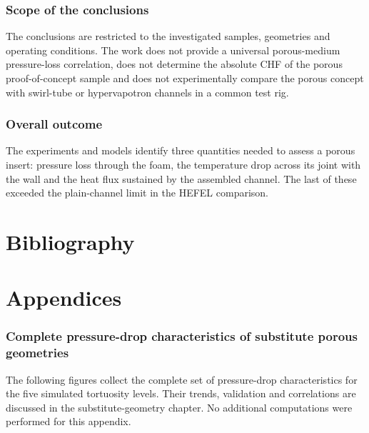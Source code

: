 \documentclass[a4paper]{article}
\begin{document}
\section{Scope of the conclusions}
The conclusions are restricted to the investigated samples, geometries and operating conditions. The work does not provide a universal porous-medium pressure-loss correlation, does not determine the absolute CHF of the porous proof-of-concept sample and does not experimentally compare the porous concept with swirl-tube or hypervapotron channels in a common test rig.

\section{Overall outcome}
The experiments and models identify three quantities needed to assess a porous insert: pressure loss through the foam, the temperature drop across its joint with the wall and the heat flux sustained by the assembled channel. The last of these exceeded the plain-channel limit in the HEFEL comparison.

\pagebreak

\part{Bibliography}
\printbibliography[filter=otherrefs,title={References},resetnumbers=true]
\pagebreak

\printbibliography[filter=mypubs,title={Publications of the Author},resetnumbers=true]

\pagebreak
\listoffigures
\listoftables

\clearpage
\appendix
\part{Appendices}

\section{Complete pressure-drop characteristics of substitute porous geometries}
\label{app:substitute-results}

The following figures collect the complete set of pressure-drop characteristics for the five simulated tortuosity levels. Their trends, validation and correlations are discussed in the substitute-geometry chapter. No additional computations were performed for this appendix.
\end{document}
